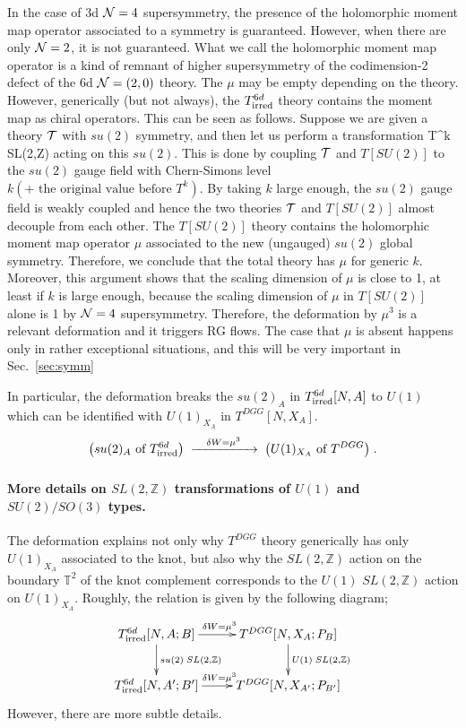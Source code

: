 \documentclass[a4paper,11pt]{article}
\def\CN{{\cal N}}
\def\CT{{\cal T}}
\def\BZ{{\mathbb Z}}
\def\beq#1\eeq{\begin{align}#1\end{align}}
\begin{document}
In the case of 3d $\CN=4$ supersymmetry, the presence of the holomorphic moment map operator associated to a symmetry is guaranteed.
However, when there are only $\CN=2$, it is not guaranteed. What we call the holomorphic moment map operator is a kind of remnant of higher supersymmetry
of the codimension-2 defect of the 6d $\CN=(2,0)$ theory. The $\mu$ may be empty depending on the theory.
However, generically (but not always), the $T^{6d}_{\rm irred}$ theory contains the moment map as chiral operators.
This can be seen as follows. Suppose we are given a theory $\CT$ with $su(2)$ symmetry, and 
then let us perform a transformation 
\beq
ST^k \in SL(2,\BZ) \label{eq:STk}
\eeq acting on this $su(2)$. This is done
by coupling $\CT$ and $T[SU(2)]$ to the $su(2)$ gauge field with Chern-Simons level $k (+\text{ the original value before }T^k)$.
By taking $k$ large enough, the $su(2)$ gauge field is weakly coupled and hence the two theories $\CT$ and $T[SU(2)]$ almost decouple from each other.
The $T[SU(2)]$ theory contains the holomorphic moment map operator $\mu$ associated to the new (ungauged) $su(2)$ global symmetry.
Therefore, we conclude that the total theory has $\mu$ for generic $k$. Moreover, this argument shows that
the scaling dimension of $\mu$ is close to 1, at least if $k$ is large enough, because the scaling dimension of $\mu$ in $T[SU(2)]$ alone is 1 by $\CN=4$
supersymmetry. Therefore, the deformation by $\mu^3$ is a relevant deformation
and it triggers RG flows. The case that $\mu$ is absent happens only in rather exceptional situations, 
and this will be very important in Sec.~\ref{sec:symm}

In particular, the deformation breaks the $su(2)_A$ in $T_{\rm irred}^{6d}[N,A]$ to $U(1)$ which can be identified with $U(1)_{X_A}$ in $T^{DGG}[N,X_A]$. 
%
\begin{align}
\big{(} su(2)_A   \textrm{ of $T^{6d}_{\rm irred}$}\big{)}\;\xrightarrow[\text{}]{\quad \delta W = \mu^3 \quad }\; \big{(} U(1)_{X_A} \textrm{ of $T^{DGG}$}\big{)}\;.
\end{align}
%

\paragraph{More details on $SL(2,\BZ)$ transformations of $U(1)$ and $SU(2)/SO(3)$ types.}
The deformation explains not only why $T^{DGG}$ theory generically has only $U(1)_{X_A}$ associated to the knot, but also why the $SL(2,\mathbb{Z})$ action on the boundary $\mathbb{T}^2$ of the knot complement corresponds to the $U(1)$ $SL(2,\mathbb{Z})$ action on $U(1)_{X_A}$. 
Roughly, the relation is given by the following diagram;
%
\begin{align}
\xymatrix{
T^{6d}_{\rm irred}[N,A;B] \ar[d]^{su(2) \; SL(2,\mathbb{Z})} \ar[r]^{ \delta W = \mu^3 \;\; } & T^{DGG}[N,X_A;P_B]\ar[d]^{U(1)\; SL(2,\mathbb{Z})}\\
T^{6d}_{\rm irred}[N,A';B'] \ar[r]^{ \delta W = \mu^3 \;\;} &T^{DGG}[N,X_{A'}; P_{B'}]}
\end{align}
%
However, there are more subtle details.
\end{document}
